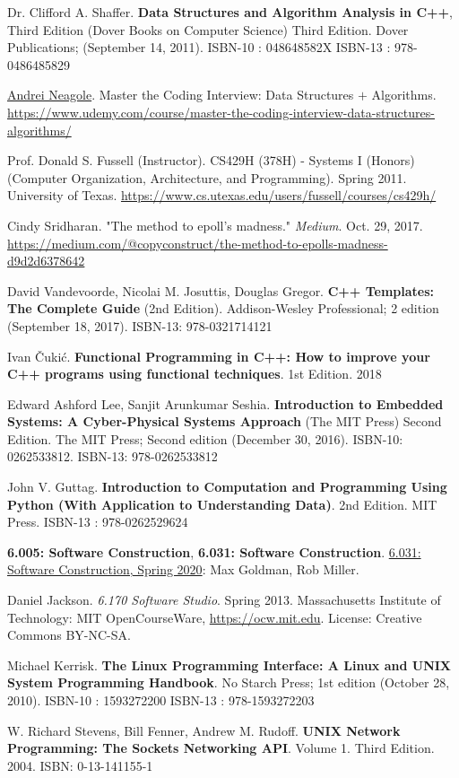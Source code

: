 \documentclass[10pt]{amsart}
\begin{document}
\begin{thebibliography}{9}
Dr. Clifford A. Shaffer. 
\textbf{Data Structures and Algorithm Analysis in C++}, Third Edition (Dover Books on Computer Science) Third Edition. Dover Publications; (September 14, 2011). ISBN-10 : 048648582X ISBN-13 : 978-0486485829 


\href{https://www.udemy.com/course/master-the-coding-interview-data-structures-algorithms/#instructor-1}{Andrei Neagole}. Master the Coding Interview: Data Structures $+$ Algorithms. 
\url{https://www.udemy.com/course/master-the-coding-interview-data-structures-algorithms/}

Prof. Donald S. Fussell (Instructor). CS429H (378H) - Systems I (Honors) (Computer Organization, Architecture, and Programming). Spring 2011. University of Texas. \url{https://www.cs.utexas.edu/users/fussell/courses/cs429h/}

 Cindy Sridharan. "The method to epoll's madness." \emph{Medium}. Oct. 29, 2017. \url{https://medium.com/@copyconstruct/the-method-to-epolls-madness-d9d2d6378642}

David Vandevoorde, Nicolai M. Josuttis, Douglas Gregor. \textbf{C++ Templates: The Complete Guide} (2nd Edition). Addison-Wesley Professional; 2 edition (September 18, 2017). ISBN-13: 978-0321714121

Ivan \v{C}uki\'{c}. \textbf{Functional Programming in C++: How to improve your C++ programs using functional techniques}. 1st Edition. 2018

Edward Ashford Lee, Sanjit Arunkumar Seshia. \textbf{Introduction to Embedded Systems: A Cyber-Physical Systems Approach} (The MIT Press) Second Edition. The MIT Press; Second edition (December 30, 2016). ISBN-10: 0262533812. ISBN-13: 978-0262533812

John V. Guttag. \textbf{Introduction to Computation and Programming Using Python (With Application to Understanding Data)}. 2nd Edition. 	MIT Press.  ISBN-13 : 978-0262529624 

\textbf{6.005: Software Construction}, \textbf{6.031: Software Construction}. \href{http://web.mit.edu/6.031/www/sp20/}{6.031: Software Construction, Spring 2020}: Max Goldman, Rob Miller.


Daniel Jackson. \emph{6.170 Software Studio}. Spring 2013. Massachusetts Institute of Technology: MIT OpenCourseWare, \url{https://ocw.mit.edu}. License: Creative Commons BY-NC-SA.\cite{Jack2013}

Michael Kerrisk. \textbf{The Linux Programming Interface: A Linux and UNIX System Programming Handbook}. No Starch Press; 1st edition (October 28, 2010). ISBN-10 : 1593272200 ISBN-13 : 978-1593272203 

W. Richard Stevens, Bill Fenner, Andrew M. Rudoff. \textbf{UNIX Network Programming: The Sockets Networking API}. Volume 1. Third Edition. 2004. ISBN: 0-13-141155-1


\end{thebibliography}
\end{document}

